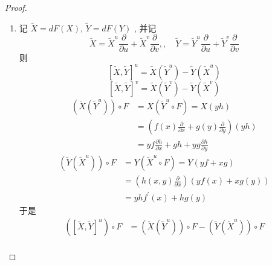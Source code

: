 \documentclass[../main.tex]{subfiles}
\begin{document}
\begin{proof}
\begin{enumerate}
         \[
         JF_{\left( x,y \right) }\begin{pmatrix} 
             h\left( x,y \right)\\ 
              0  
         \end{pmatrix}= \begin{pmatrix} 
               yh\left( x,y \right)\\ 
                -\frac{y h\left( x,y \right) }{x^{2} }  
         \end{pmatrix}  
         \]因此 \[
         \,\mathrm{d} _{\left( x,y \right) }F\left( Y \right)=  yh\left( x,y \right)\frac{\partial }{\partial u}-\frac{yh\left( x,y \right)  }{x^{2} }\frac{\partial }{\partial v}   
         \]
        \item 记 \(  \tilde{X}= d F\left( X \right)   \), \(  \tilde{Y}=  d F\left( Y \right)   \)  , 并记 \[
        \tilde{X}=  \tilde{X}^{u}\frac{\partial }{\partial u}+ \tilde{X}^{v}\frac{\partial }{\partial v},,\quad \tilde{Y}= \tilde{Y}^{u}\frac{\partial }{\partial u}+ \tilde{Y}^{v}\frac{\partial }{\partial v}
        \]则\[
        \left[ \tilde{X}, \tilde{Y} \right] ^{u}= \tilde{X}\left( \tilde{Y}^{u} \right)- \tilde{Y}\left( \tilde{X}^{u} \right)  
        \] \[
        \left[ \tilde{X},\tilde{Y} \right]^{v}= \tilde{X}\left( \tilde{Y} ^{v}\right)-\tilde{Y}\left( \tilde{X}^{v} \right)   
        \] \[
        \begin{aligned}
        \left( \tilde{X}\left( \tilde{Y}^{u} \right)  \right)\circ F&=  X\left( \tilde{Y}^{u}\circ F \right)= X\left( yh \right)  \\ 
         &= \left( f\left( x \right)\frac{\partial }{\partial x}+ g\left( y \right)\frac{\partial }{\partial y}   \right)   \left( yh \right)\\ 
          &= yf\frac{\partial h}{\partial x}+ gh+ yg\frac{\partial h}{\partial y} 
        \end{aligned}
        \] \[
        \begin{aligned}
        \left( \tilde{Y}\left( \tilde{X}^{u} \right)  \right)\circ F&= Y\left( \tilde{X}^{u}\circ F \right)   = Y\left( yf+ xg \right) \\ 
         &= \left( h\left( x,y \right)\frac{\partial }{\partial x}  \right)\left( yf\left( x \right)+ xg\left( y \right)   \right)\\ 
          &= yhf^{\prime} \left( x \right)+ hg\left( y \right)    
        \end{aligned}
        \]于是 \[
        \begin{aligned}
        \left( \left[ \tilde{X},\tilde{Y} \right]^{u}  \right)\circ F&=  \left( \tilde{X}\left( \tilde{Y}^{u} \right)  \right)\circ F-\left( \tilde{Y}\left( \tilde{X}^{u} \right)  \right)\circ F\\ 

\end{aligned}\]
\end{enumerate}
\end{proof}
\end{document}
